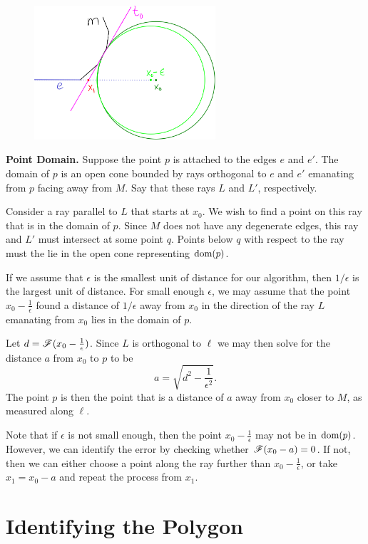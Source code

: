 \documentclass[12pt]{article}
\begin{document}
\begin{flushleft}
\begin{figure}[H]
	\centering
	\includegraphics[width=0.6\textwidth]{inf_tangent.png}
\end{figure}

\textbf{Point Domain.}
Suppose the point $p$ is attached to the edges $e$ and $e'$.
The domain of $p$ is an open cone bounded by rays orthogonal to $e$ and $e'$ emanating from $p$ facing away from $M$.
Say that these rays $L$ and $L'$, respectively.

Consider a ray parallel to $L$ that starts at $x_0$.
We wish to find a point on this ray that is in the domain of $p$.
Since $M$ does not have any degenerate edges, this ray and $L'$ must intersect at some point $q$.
Points below $q$ with respect to the ray must the lie in the open cone representing $\text{dom}(p)$.

If we assume that $\epsilon$ is the smallest unit of distance for our algorithm, then $1/\epsilon$ is the largest unit of distance. 
For small enough $\epsilon$, we may assume that the point $x_0-\frac{1}{\epsilon}$ found a distance of $1/\epsilon$ away from $x_0$ in the direction of the ray $L$ emanating from $x_0$ lies in the domain of $p$.

Let $d=\mathscr{F}(x_0-\frac{1}{\epsilon})$.
Since $L$ is orthogonal to $\ell$ we may then solve for the distance $a$ from $x_0$ to $p$ to be 
\[a = \sqrt{d^2-\frac{1}{\epsilon^2}}.\]
The point $p$ is then the point that is a distance of $a$ away from $x_0$ closer to $M$, as measured along $\ell$.

Note that if $\epsilon$ is not small enough, then the point $x_0-\frac{1}{\epsilon}$ may not be in $\text{dom}(p)$.
However, we can identify the error by checking whether $\mathscr{F}(x_0-a)=0$.
If not, then we can either choose a point along the ray further than $x_0-\frac{1}{\epsilon}$, or take $x_1=x_0-a$ and repeat the process from $x_1$.



\section{Identifying the Polygon}


\end{flushleft}
\end{document}
